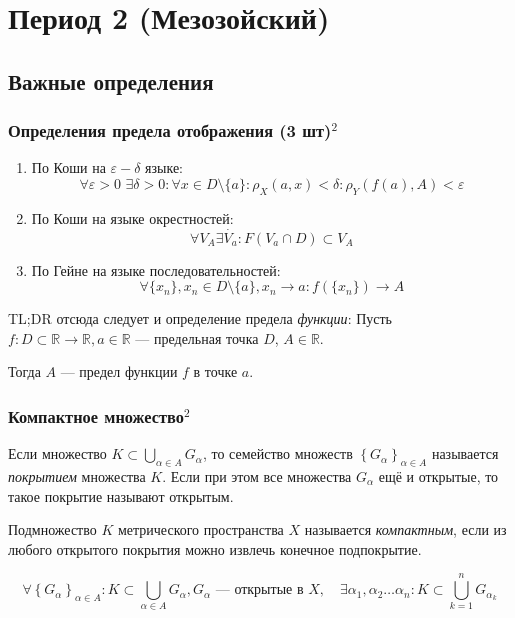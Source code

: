 \documentclass{article}
\def\dbl{\,\,}
\begin{document}
\newpage



\section{Период 2 (Мезозойский)}
\subsection{Важные определения}
\subsubsection{Определения предела отображения (3 шт)\texorpdfstring{$^2$}{}}

\begin{enumerate}
    \item По Коши на $\varepsilon - \delta$ языке:
    \[\forall \varepsilon > 0 \dbl \exists \delta > 0 : \forall x \in D \setminus \{a\} : \rho_X(a, x) < \delta : \rho_Y(f(a), A) < \varepsilon\]
    \item По Коши на языке окрестностей:
    \[\forall V_A \exists \dot{V_a} :
     F(V_a \cap D) \subset V_A\]
     \item По Гейне на языке последовательностей:
     \[\forall \{x_n\}, x_n \in D \setminus \{a\}, x_n \rightarrow a : f(\{x_n\}) \rightarrow A\]
\end{enumerate}

TL;DR отсюда следует и определение предела \textit{функции}: Пусть $f: D \subset \mathbb{R} \rightarrow \mathbb{R}, a \in \mathbb{R}$ --- предельная точка $D$, $A \in \mathbb{R}$.

Тогда $A$ --- предел функции $f$ в точке $a$.


\subsubsection{Компактное множество\texorpdfstring{$^2$}{}}

Если множество $K \subset \bigcup_{\alpha \in A}G_\alpha$, то  семейство множеств $\left\{G_\alpha\right\}_{\alpha \in A}$ называется \textit{покрытием} множества $K$. Если при этом все множества $G_\alpha$ ещё и открытые, то такое покрытие называют открытым.

Подмножество $K$ метрического пространства $X$ называется \textit{компактным}, если из любого открытого покрытия можно извлечь конечное подпокрытие.

\[\forall \left\{G_\alpha\right\}_{\alpha \in A} : K \subset \bigcup_{\alpha \in A}G_\alpha, G_\alpha \textit{ --- открытые в } X, \quad \exists \alpha_1, \alpha_2 \ldots \alpha_n : K \subset \bigcup_{k = 1}^nG_{\alpha_k}\]
\end{document}
